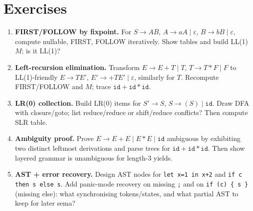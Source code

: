 \section{Exercises}
\label{sec:ch03-exercises}
\begin{enumerate}[label=E3.\arabic*, leftmargin=*, itemsep=0.8em]
\item \textbf{FIRST/FOLLOW by fixpoint.} For $S\to AB$, $A\to aA\mid\varepsilon$, $B\to bB\mid\varepsilon$, compute nullable, FIRST, FOLLOW iteratively. Show tables and build LL(1) $M$; is it LL(1)?
\item \textbf{Left-recursion elimination.} Transform $E\to E+T\mid T$, $T\to T*F\mid F$ to LL(1)-friendly $E\to TE'$, $E'\to+TE'\mid\varepsilon$, similarly for $T$. Recompute FIRST/FOLLOW and $M$; trace $\texttt{id}+\texttt{id}*\texttt{id}$.
\item \textbf{LR(0) collection.} Build LR(0) items for $S'\to S$, $S\to (S)\mid\texttt{id}$. Draw DFA with closure/goto; list reduce/reduce or shift/reduce conflicts? Then compute SLR table.
\item \textbf{Ambiguity proof.} Prove $E\to E+E\mid E*E\mid \texttt{id}$ ambiguous by exhibiting two distinct leftmost derivations and parse trees for $\texttt{id}+\texttt{id}*\texttt{id}$. Then show layered grammar is unambiguous for length-3 yields.
\item \textbf{AST + error recovery.} Design AST nodes for \texttt{let x=1 in x+2} and \texttt{if c then s else s}. Add panic-mode recovery on missing \texttt{;} and on \texttt{if (c) \{ s \}} (missing else): what synchronising tokens/states, and what partial AST to keep for later sema?
\end{enumerate}


